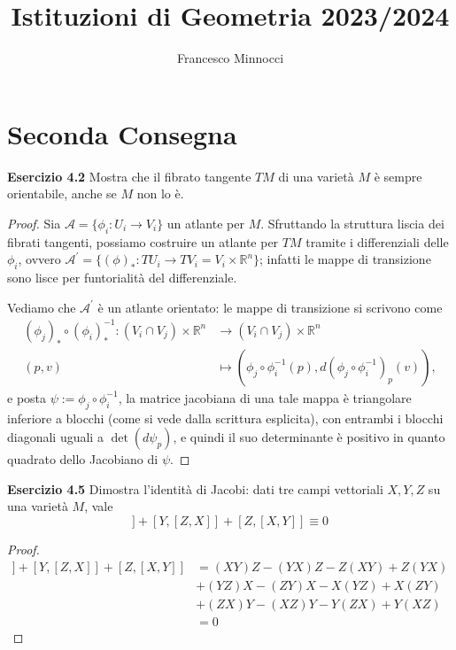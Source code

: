 \documentclass[a4paper]{article}
\title{Istituzioni di Geometria 2023/2024}
\author{Francesco Minnocci}
\newcommand{\R}{\mathbb{R}}
\theoremstyle{definition}
\theoremstyle{definition}
\theoremstyle{remark}
\theoremstyle{definition}
\begin{document}
\maketitle
\section*{Seconda Consegna}
\textbf{Esercizio 4.2}
Mostra che il fibrato tangente $TM$ di una varietà $M$ è sempre orientabile, anche se $M$ non lo è.

\begin{proof}
    Sia $\mathcal{A}=\{\phi_i:U_i\to V_i\}$ un atlante per $M$. Sfruttando la struttura liscia dei fibrati tangenti, possiamo costruire un atlante per $TM$ tramite i differenziali delle $\phi_i$,
    ovvero $\mathcal{A}^\prime=\{(\phi)_*:TU_i\to TV_i=V_i\times\R^n\}$; infatti le mappe di transizione sono lisce per funtorialità del differenziale.

Vediamo che $\mathcal{A}^\prime$ è un atlante orientato: le mappe di transizione si scrivono come
\begin{align*}
    (\phi_j)_*\circ(\phi_i)_*^{-1}:(V_i\cap V_j)\times\R^n&\to(V_i\cap V_j)\times\R^n\\
    (p,v)&\mapsto(\phi_j\circ\phi_i^{-1}(p),d(\phi_j\circ\phi_i^{-1})_p(v)),
\end{align*}
e posta $\psi := \phi_j\circ\phi_i^{-1}$, la matrice jacobiana di una tale mappa è triangolare inferiore a blocchi (come si vede dalla scrittura esplicita), con entrambi i blocchi
diagonali uguali a $\det(d\psi_p)$, e quindi il suo determinante è positivo in quanto quadrato dello Jacobiano di $\psi$.
\end{proof}

\textbf{Esercizio 4.5}
Dimostra l'identità di Jacobi: dati tre campi vettoriali $X,Y,Z$ su una varietà $M$, vale
\begin{equation*}
    [X,[Y,Z]] + [Y,[Z,X]] + [Z,[X,Y]] \equiv 0
\end{equation*}

\begin{proof}
\begin{align*}
    [X,[Y,Z]] + [Y,[Z,X]] + [Z,[X,Y]] &= (XY)Z - (YX)Z - Z(XY) + Z(YX) \\
    &+ (YZ)X - (ZY)X - X(YZ) + X(ZY) \\
    &+ (ZX)Y - (XZ)Y - Y(ZX) + Y(XZ) \\
    &= 0
\end{align*}
\end{proof}
\end{document}
